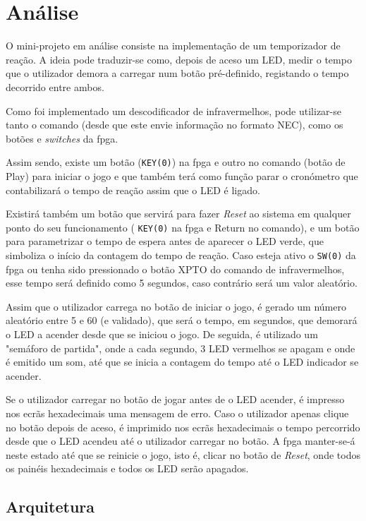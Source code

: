 \documentclass[a4paper,11pt,onecolumn]{report}
\begin{document}
\chapter{Análise}
\label{chap.analise}
O mini-projeto em análise consiste na implementação de um temporizador de reação. A ideia pode traduzir-se como, depois de aceso um LED, medir o tempo que o utilizador demora a carregar num botão pré-definido, registando o tempo decorrido entre ambos. 

Como foi implementado um descodificador de infravermelhos, pode utilizar-se tanto o comando (desde que este envie informação no formato NEC), como os botões e \textit{switches} da \ac{fpga}. 

Assim sendo, existe um botão (\texttt{KEY(0)}) na \ac{fpga} e outro no comando (botão de Play) para iniciar o jogo e que também terá como função parar o cronómetro que contabilizará o tempo de reação assim que o LED é ligado.

Existirá também um botão que servirá para fazer \textit{Reset} ao sistema em qualquer ponto do seu funcionamento ( \texttt{KEY(0)} na \ac{fpga} e Return no comando), e um botão para parametrizar o tempo de espera antes de aparecer o LED verde, que simboliza o início da contagem do tempo de reação. Caso esteja ativo o \texttt{SW(0)} da \ac{fpga} ou tenha sido pressionado o botão XPTO do comando de infravermelhos, esse tempo será definido como 5 segundos, caso contrário será um valor aleatório.

Assim que o utilizador carrega no botão de iniciar o jogo, é gerado um número aleatório entre 5 e 60 (e validado), que será o tempo, em segundos, que demorará o LED a acender desde que se iniciou o jogo. De seguida, é utilizado um "semáforo de partida", onde a cada segundo, 3 LED vermelhos se apagam e onde é emitido um som, até que se inicia a contagem do tempo até o LED indicador se acender.

Se o utilizador carregar no botão de jogar antes de o LED acender, é impresso nos ecrãs hexadecimais uma mensagem de erro. Caso o utilizador apenas clique no botão depois de aceso, é imprimido nos ecrãs hexadecimais o tempo percorrido desde que o LED acendeu até o utilizador carregar no botão. A \ac{fpga} manter-se-á neste estado até que se reinicie o jogo, isto é, clicar no botão de \textit{Reset}, onde todos os painéis hexadecimais e todos os LED serão apagados.

\section{Arquitetura}
\end{document}
